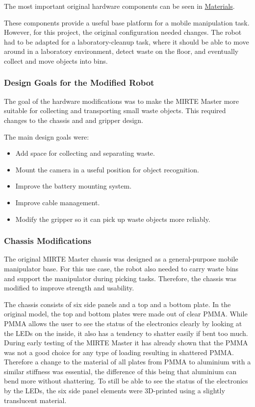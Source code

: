 The most important original hardware components can be seen in \href{https://matt-rbt.github.io/Lab-Cleanup-Robot-using-the-Mirte-Master-Platform/materials/}{Materials}.

These components provide a useful base platform for a mobile manipulation task. However, for this project, the original configuration needed changes. The robot had to be adapted for a laboratory-cleanup task, where it should be able to move around in a laboratory environment, detect waste on the floor, and eventually collect and move objects into bins.

\subsubsection{Design Goals for the Modified Robot}

The goal of the hardware modifications was to make the MIRTE Master more suitable for collecting and transporting small waste objects. This required changes to the chassis and and gripper design.

The main design goals were:


\begin{itemize}
\item Add space for collecting and separating waste.
\item Mount the camera in a useful position for object recognition.
\item Improve the battery mounting system.
\item Improve cable management.
\item Modify the gripper so it can pick up waste objects more reliably.
\end{itemize}

\subsubsection{Chassis Modifications}

The original MIRTE Master chassis was designed as a general-purpose mobile manipulator base. For this use case, the robot also needed to carry waste bins and support the manipulator during picking tasks. Therefore, the chassis was modified to improve strength and usability.

The chassis consists of six side panels and a top and a bottom plate. In the original model, the top and bottom plates were made out of clear PMMA. While PMMA allows the user to see the status of the electronics clearly by looking at the LEDs on the inside, it also has a tendency to shatter easily if bent too much. During early testing of the MIRTE Master it has already shown that the PMMA was not a good choice for any type of loading resulting in shattered PMMA. Therefore a change to the material of all plates from PMMA to aluminium with a similar stiffness was essential, the difference of this being that aluminium can bend more without shattering. To still be able to see the status of the electronics by the LEDs, the six side panel elements were 3D-printed using a slightly translucent material.

